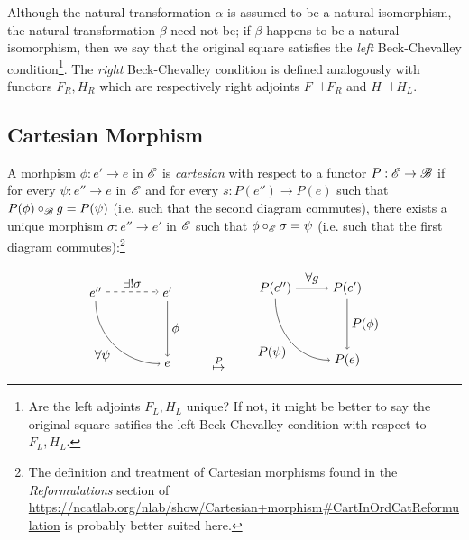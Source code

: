 \documentclass[12pt]{article}
\theoremstyle{definition}
\theoremstyle{remark}
\begin{document}
Although the natural transformation $\alpha$ is assumed to be a natural isomorphism, the natural transformation $\beta$ need not be; if $\beta$ happens to be a natural isomorphism, then we say that the original square satisfies the \textit{left} Beck-Chevalley condition\footnote{Are the left adjoints $F_L, H_L$ unique? If not, it might be better to say the original square satifies the left Beck-Chevalley condition with respect to $F_L, H_L$.}. The \textit{right} Beck-Chevalley condition is defined analogously with functors $F_R, H_R$ which are respectively right adjoints $F \dashv F_R$ and $H \dashv H_L$.

\subsection{Cartesian Morphism}

A morhpism $\phi : e' \to e$ in $\mathscr{E}$ is \textit{cartesian} with respect to a functor $P : \mathscr{E} \to \mathscr{B}$ if for every $\psi : e'' \to e$ in $\mathscr{E}$ and for every $s : P(e'') \to P(e)$ such that $ P(\phi) \circ_{\mathscr{B}} g = P(\psi)$ (i.e. such that the second diagram commutes), there exists a unique morphism $\sigma : e'' \to e'$ in $\mathscr{E}$ such that $\phi \circ_{\mathscr{E}} \sigma = \psi$ (i.e. such that the first diagram commutes):\footnote{The definition and treatment of Cartesian morphisms found in the \textit{Reformulations} section of \url{https://ncatlab.org/nlab/show/Cartesian+morphism\#CartInOrdCatReformulation} is probably better suited here.}

\[
    \begin{tikzpicture}
        \draw (-1,+1) node(tl){$e''$};
        \draw (+1,+1) node(tr){$e'$};
        \draw (+1,-1) node(br){$e$};

        \draw[dashed, ->] (tl) to node[above]{$\exists!\sigma$} (tr);
        \draw[->] (tl) to[out=-90, in=180] node[below left]{$\forall\psi$} (br);
        \draw[->] (tr) to node[right]{$\phi$} (br);
    \end{tikzpicture}
    \qquad
    \stackrel{P}{\mapsto}
    \qquad
    \begin{tikzpicture}
        \draw (-1,+1) node(tl){$P(e'')$};
        \draw (+1,+1) node(tr){$P(e')$};
        \draw (+1,-1) node(br){$P(e)$};

        \draw[->] (tl) to node[above]{$\forall g$} (tr);
        \draw[->] (tl) to[out=-90, in=180] node[below left]{$P(\psi)$} (br);
        \draw[->] (tr) to node[right]{$P(\phi)$} (br);
    \end{tikzpicture}
\]
\end{document}
